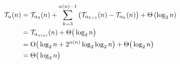\begin{equation*}
\begin{aligned}
\mathcal{T}_\alpha(n)
& = \mathcal{T}_{\alpha_3}(n)
+ \sum_{k = 3}^{\alpha(n) - 1} \big(\mathcal{T}_{\alpha_{k+1}}(n) - \mathcal{T}_{\alpha_{k}}(n)\big) + \Theta\left(\log_2 n\right) \\
& = \mathcal{T}_{\alpha_{\alpha(n)}}(n) + \Theta\big(\log_2 n\big) \\
& = \text{O}\big(\log_2n + 2^{\alpha(n)}\log_2\log_2n \big) + \Theta\big(\log_2n\big) \\
& = \Theta\big(\log_2n\big)
\end{aligned}
\end{equation*}

\renewcommand{\Tleb}{\runtime_{\li{leb}}}
\renewcommand{\Tsucc}{\runtime_{\li{succ}}}

